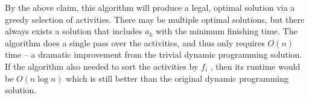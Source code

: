 \documentclass [12pt]{article}
\theoremstyle{definition}
\begin{document}
By the above claim, this algorithm will produce a legal, optimal solution via a greedy selection of activities. There may be multiple optimal solutions, but there always exists a solution that includes $a_k$ with the minimum finishing time. The algorithm does a single pass over the activities, and thus only requires $O(n)$ time – a dramatic improvement from the trivial dynamic programming solution. If the algorithm also needed to sort the activities by $f_i$ , then its runtime would be $O(n \log n)$ which is still better than the original dynamic programming solution.
\end{document}
